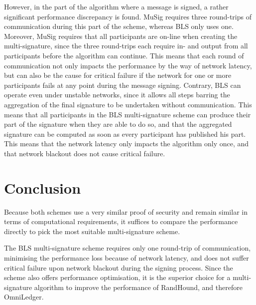 However, in the part of the algorithm where a message is signed, a rather significant performance discrepancy is found. MuSig requires three round-trips of communication during this part of the scheme, whereas BLS only uses one. Moreover, MuSig requires that all participants are on-line when creating the multi-signature, since the three round-trips each require in- and output from all participants before the algorithm can continue. This means that each round of communication not only impacts the performance by the way of network latency, but can also be the cause for critical failure if the network for one or more participants fails at any point during the message signing. Contrary, BLS can operate even under unstable networks, since it allows all steps barring the aggregation of the final signature to be undertaken without communication. This means that all participants in the BLS multi-signature scheme can produce their part of the signature when they are able to do so, and that the aggregated signature can be computed as soon as every participant has published his part. This means that the network latency only impacts the algorithm only once, and that network blackout does not cause critical failure.

\section{Conclusion}
Because both schemes use a very similar proof of security and remain similar in terms of computational requirements, it suffices to compare the performance directly to pick the most suitable multi-signature scheme.

The BLS multi-signature scheme requires only one round-trip of communication, minimising the performance loss because of network latency, and does not suffer critical failure upon network blackout during the signing process. Since the scheme also offers performance optimisation, it is the superior choice for a multi-signature algorithm to improve the performance of RandHound, and therefore OmniLedger.